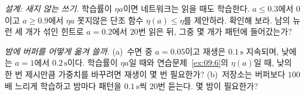 \begin{exercise}[\lvlB]
\label{ex:09:6}
\emph{설계: 새지 않는 쓰기.} 학습률이 $\eta a$이면 네트워크는 읽을 때도 학습한다. $a\le0.3$에서 0이고 $a\ge0.9$에서 $\eta a$ 못지않은 단조 함수 $\eta(a)\le\eta$를 제안하라. 확인해 보라. 남의 뉴런 세 개가 섞인 힌트로 $a=0.2$에서 $20$번 읽은 뒤, 그중 몇 개가 패턴에 들어갔는가?
\end{exercise}

\begin{exercise}[\lvlC]
\label{ex:09:7}
\emph{밤에 버퍼를 어떻게 옮겨 쓸까.} (a)~수면 중 $a=0.05$이고 재생은 $0.1\,\text{s}$ 지속되며, 낮에는 $a=1$에서 $0.2\,\text{s}$이다. 학습률이 $\eta a$일 때와 연습문제~\ref{ex:09:6}의 $\eta(a)$일 때, 낮의 한 번 제시만큼 가중치를 바꾸려면 재생이 몇 번 필요한가? (b)~저장소는 버퍼보다 $100$배 느리게 학습하고 밤마다 패턴을 $0.1\,\text{s}$씩 $20$번 듣는다. 몇 밤이 필요한가?
\end{exercise}
